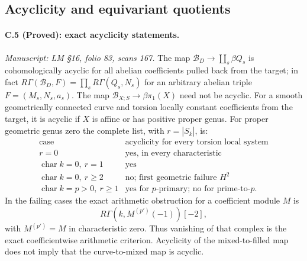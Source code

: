 \subsection{Acyclicity and equivariant quotients}

\paragraph{C.5 (Proved): exact acyclicity statements.}\label{C5}
\textit{Manuscript: LM \S16, folio 83, scans 167.}
The map $\mathcal B_D\to\coprod_s\beta Q_s$ is
cohomologically acyclic for all abelian
coefficients pulled back from the target; in
fact $R\Gamma(\mathcal B_D,F)=\prod_sR\Gamma(Q_s,N_s)$
for an arbitrary abelian triple $F=(M_s,N_s,a_s)$.
The map $\mathcal B_{X;S}\to\beta\pi_1(X)$ need
not be acyclic. For a smooth geometrically
connected curve and torsion locally constant
coefficients from the target, it is acyclic
if $X$ is affine or has positive proper genus.
For proper geometric genus zero the complete
list, with $r=|S_{\bar k}|$, is:
\[
\begin{array}{c|c}
 \text{case}&\text{acyclicity for every torsion local system}\\\hline
 r=0&\text{yes, in every characteristic}\\
 \operatorname{char}k=0,\ r=1&\text{yes}\\
 \operatorname{char}k=0,\ r\geq2&\text{no; first geometric failure }H^2\\
 \operatorname{char}k=p>0,\ r\geq1
       &\text{yes for }p\text{-primary; no for prime-to-}p.
\end{array}                                                     \tag{C.5.1}
\]
In the failing cases the exact arithmetic obstruction
for a coefficient module $M$ is
\[
 R\Gamma(k,M^{(p')}(-1))[-2],
\]
with $M^{(p')}=M$
in characteristic zero. Thus vanishing of that
complex is the exact coefficientwise arithmetic
criterion. Acyclicity of the mixed-to-filled map
does not imply that the curve-to-mixed map is
acyclic.

